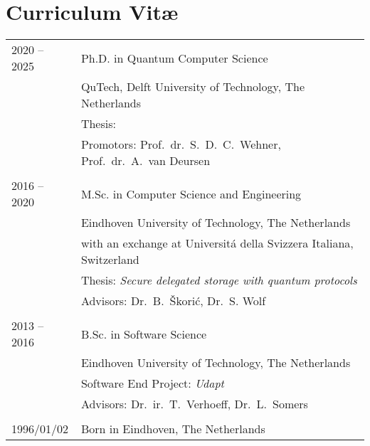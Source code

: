 \chapter*{Curriculum Vit\ae}

\makeatletter
\authors{\@firstname\ {\titleshape\@lastname}}
\def\thesistitle{\@title}
\makeatother

\newlength{\tabcolsepold}
\setlength{\tabcolsepold}{\tabcolsep}
\setlength{\tabcolsep}{0cm}

\noindent
\begin{tabularx}{\linewidth}{p{2cm}X}
    2020 -- 2025 & Ph.D. in Quantum Computer Science \\
                 & QuTech, Delft University of Technology, The Netherlands \\
                 & Thesis: \emph{\thesistitle} \\
                 & Promotors: Prof.\ dr.\ S.\ D.\ C.\ Wehner, Prof.\ dr.\ A.\ van Deursen \\
    \\
    2016 -- 2020 & M.Sc. in Computer Science and Engineering \\
                 & Eindhoven University of Technology, The Netherlands \\
                 & with an exchange at Universitá della Svizzera Italiana, Switzerland \\
                 & Thesis: \emph{Secure delegated storage with quantum protocols} \\
                 & Advisors: Dr.\ B.\ Škorić, Dr.\ S. Wolf \\
    \\
    2013 -- 2016 & B.Sc. in Software Science \\
                 & Eindhoven University of Technology, The Netherlands \\
                 & Software End Project: \emph{Udapt} \\
                 & Advisors: Dr.\ ir.\ T.\ Verhoeff, Dr.\ L.\ Somers \\
    \\
    1996/01/02   & Born in Eindhoven, The Netherlands \\
\end{tabularx}

\setlength{\tabcolsep}{\tabcolsepold}
